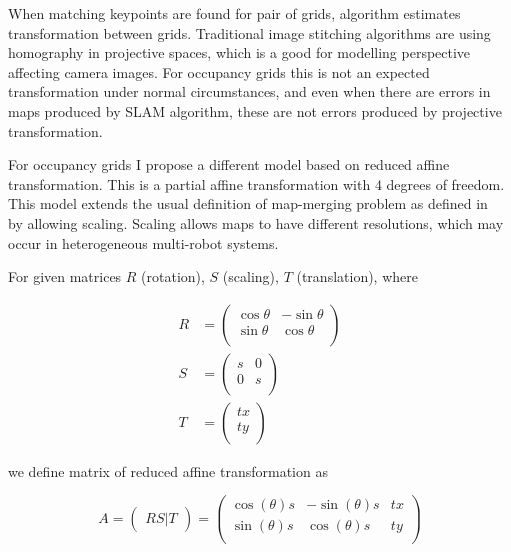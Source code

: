 When matching keypoints are found for pair of grids, algorithm estimates transformation between grids. Traditional image stitching algorithms are using homography in projective spaces, which is a good for modelling perspective affecting camera images. For occupancy grids this is not an expected transformation under normal circumstances, and even when there are errors in maps produced by \gls{SLAM} algorithm, these are not errors produced by projective transformation.

For occupancy grids I propose a different model based on reduced affine transformation. This is a partial affine transformation with $4$ degrees of freedom. This model extends the usual definition of map-merging problem as defined in~\cite{Lee2012} by allowing scaling. Scaling allows maps to have different resolutions, which may occur in heterogeneous multi-robot systems.

\begin{defn}
For given matrices $R$ (rotation), $S$ (scaling), $T$ (translation), where

\begin{align}
    R &=
    \begin{pmatrix}
        \cos{\theta} & -\sin{\theta} \\
        \sin{\theta} & \cos{\theta} \\
    \end{pmatrix} \\
    S &=
    \begin{pmatrix}
        s & 0 \\
        0 & s \\
    \end{pmatrix} \\
    T &=
    \begin{pmatrix}
        tx \\
        ty \\
    \end{pmatrix}
\end{align}

we define matrix of reduced affine transformation as

\begin{equation}
    A =
    \begin{pmatrix}
        RS|T
    \end{pmatrix}
    =
    \begin{pmatrix}
        \cos(\theta)s & -\sin(\theta)s & tx \\
        \sin(\theta)s & \cos(\theta)s & ty \\
    \end{pmatrix}
\end{equation}
\end{defn}

